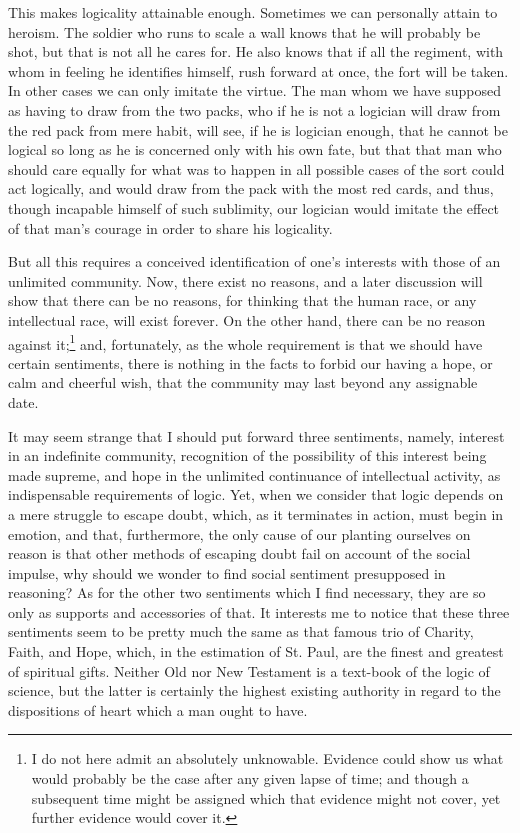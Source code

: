 This makes logicality attainable enough. Sometimes we can personally attain to heroism. The soldier who runs to scale a wall knows that he will probably be shot, but that is not all he cares for. He also knows that if all the regiment, with whom in feeling he identifies himself, rush forward at once, the fort will be taken. In other cases we can only imitate the virtue. The man whom we have supposed as having to draw from the two packs, who if he is not a logician will draw from the red pack from mere habit, will see, if he is logician enough, that he cannot be logical so long as he is concerned only with his own fate, but that that man who should care equally for what was to happen in all possible cases of the sort could act logically, and would draw from the pack with the most red cards, and thus, though incapable himself of such sublimity, our logician would imitate the effect of that man's courage in order to share his logicality.

But all this requires a conceived identification of one's interests with those of an unlimited community. Now, there exist no reasons, and a later discussion will show that there can be no reasons, for thinking that the human race, or any intellectual race, will exist forever. On the other hand, there can be no reason against it;\footnote{I do not here admit an absolutely unknowable. Evidence could show us what would probably be the case after any given lapse of time; and though a subsequent time might be assigned which that evidence might not cover, yet further evidence would cover it.} and, fortunately, as the whole requirement is that we should have certain sentiments, there is nothing in the facts to forbid our having a hope, or calm and cheerful wish, that the community may last beyond any assignable date.

It may seem strange that I should put forward three sentiments, namely, interest in an indefinite community, recognition of the possibility of this interest being made supreme, and hope in the unlimited continuance of intellectual activity, as indispensable requirements of logic. Yet, when we consider that logic depends on a mere struggle to escape doubt, which, as it terminates in action, must begin in emotion, and that, furthermore, the only cause of our planting ourselves on reason is that other methods of escaping doubt fail on account of the social impulse, why should we wonder to find social sentiment presupposed in reasoning? As for the other two sentiments which I find necessary, they are so only as supports and accessories of that. It interests me to notice that these three sentiments seem to be pretty much the same as that famous trio of Charity, Faith, and Hope, which, in the estimation of St. Paul, are the finest and greatest of spiritual gifts. Neither Old nor New Testament is a text-book of the logic of science, but the latter is certainly the highest existing authority in regard to the dispositions of heart which a man ought to have.

